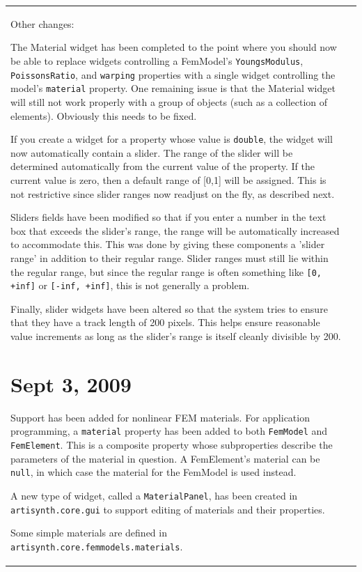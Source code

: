 \documentclass{article}
\begin{document}
\begin{tabular}{ll}
Other changes:

The Material widget has been completed to the point where you should
now be able to replace widgets controlling a FemModel's
{\tt YoungsModulus}, {\tt PoissonsRatio}, and {\tt warping} properties with a
single widget controlling the model's {\tt material} property. One
remaining issue is that the Material widget will still not work
properly with a group of objects (such as a collection of
elements). Obviously this needs to be fixed.

If you create a widget for a property whose value is {\tt double}, the
widget will now automatically contain a slider. The range of the
slider will be determined automatically from the current value of the
property. If the current value is zero, then a default range of [0,1]
will be assigned. This is not restrictive since slider ranges now
readjust on the fly, as described next.

Sliders fields have been modified so that if you enter a number in the
text box that exceeds the slider's range, the range will be
automatically increased to accommodate this. This was done by giving
these components a 'slider range' in addition to their regular
range. Slider ranges must still lie within the regular range, but
since the regular range is often something like {\tt [0, +inf]} or 
{\tt [-inf, +inf]}, this is not generally a problem.

Finally, slider widgets have been altered so that the system tries to
ensure that they have a track length of 200 pixels.  This helps ensure
reasonable value increments as long as the slider's range is itself
cleanly divisible by 200.

\section*{Sept 3, 2009}

Support has been added for nonlinear FEM materials. For application
programming, a {\tt material} property has been added to both {\tt FemModel}
and {\tt FemElement}. This is a composite property whose subproperties
describe the parameters of the material in question. A FemElement's
material can be {\tt null}, in which case the material for the FemModel is
used instead.

A new type of widget, called a {\tt MaterialPanel}, has been created in
{\tt artisynth.core.gui} to support editing of materials and their
properties.

Some simple materials are defined in
{\tt artisynth.core.femmodels.materials}.


\end{tabular}
\end{document}
